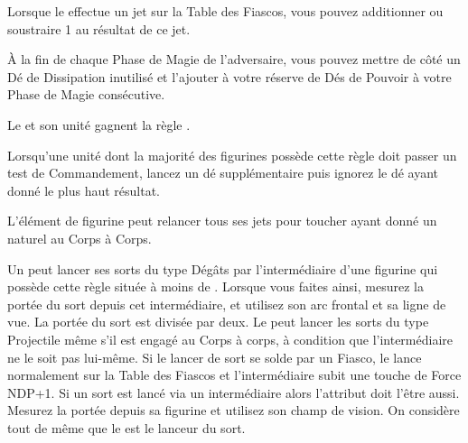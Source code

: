 {\begin{multicols}{2}
Lorsque le \cuatllord{} effectue un jet sur la Table des Fiascos, vous pouvez additionner ou soustraire 1 au résultat de ce jet.

À la fin de chaque Phase de Magie de l'adversaire, vous pouvez mettre de côté un Dé de Dissipation inutilisé et l'ajouter à votre réserve de Dés de Pouvoir à votre Phase de Magie consécutive.

Le \cuatllord{} et son unité gagnent la règle \terror{}.

\endpricelistNSP
\end{multicols}

\closearmynewsection
}

\newcommand{\QRSnote}{%
\noindent\refsymbol{} Un membre d'équipage de moins quand il sert de monture.
}











\startarmyspecialrules

\armyspecialruleentry{\coldblooded}

Lorsqu'une unité dont la majorité des figurines possède cette règle doit passer un test de Commandement, lancez un dé supplémentaire puis ignorez le dé ayant donné le plus haut résultat.

\armyspecialruleentry{\bornpredator}

L'élément de figurine peut relancer tous ses jets pour toucher ayant donné un  naturel au Corps à Corps.

\armyspecialruleentry{\telepathiclink}

Un \cuatllord{} peut lancer ses sorts du type Dégâts par l'intermédiaire d'une figurine qui possède cette règle située à moins de . Lorsque vous faites ainsi, mesurez la portée du sort depuis cet intermédiaire, et utilisez son arc frontal et sa ligne de vue. La portée du sort est divisée par deux. Le \cuatllord{} peut lancer les sorts du type Projectile même s'il est engagé au Corps à corps, à condition que l'intermédiaire ne le soit pas lui-même. Si le lancer de sort se solde par un Fiasco, le \cuatllord{} lance normalement sur la Table des Fiascos et l'intermédiaire subit une touche de Force NDP+1. Si un sort est lancé via un intermédiaire alors l'attribut doit l'être aussi. Mesurez la portée depuis sa figurine et utilisez son champ de vision. On considère tout de même que le \cuatllord{} est le lanceur du sort.

